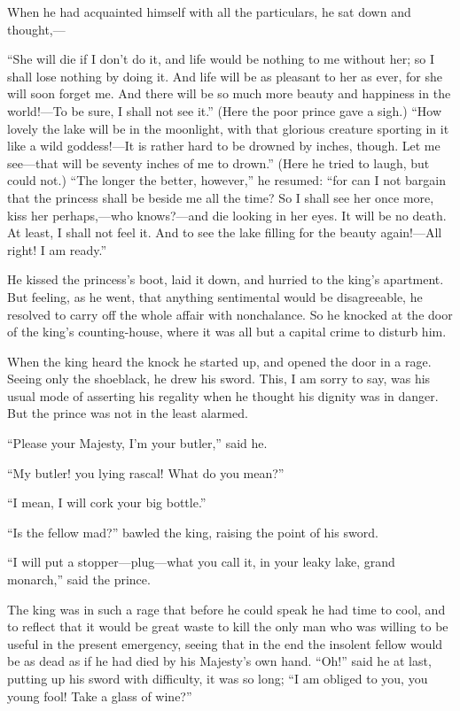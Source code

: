 \documentclass[12pt]{memoir}
\begin{document}
When he had acquainted himself with all the particulars, he sat down
and thought,---

``She will die if I don't do it, and life would be nothing to me
without her; so I shall lose nothing by doing it.  And life will be as
pleasant to her as ever, for she will soon forget me.  And there will
be so much more beauty and happiness in the world!---To be sure, I
shall not see it.''  (Here the poor prince gave a sigh.) ``How lovely
the lake will be in the moonlight, with that glorious creature
sporting in it like a wild goddess!---It is rather hard to be drowned
by inches, though.  Let me see---that will be seventy inches of me to
drown.''  (Here he tried to laugh, but could not.)  ``The longer the
better, however,'' he resumed: ``for can I not bargain that the
princess shall be beside me all the time?  So I shall see her once
more, kiss her perhaps,---who knows?---and die looking in her eyes.
It will be no death.  At least, I shall not feel it.  And to see the
lake filling for the beauty again!---All right!  I am ready.''

He kissed the princess's boot, laid it down, and hurried to the king's
apartment.  But feeling, as he went, that anything sentimental would
be disagreeable, he resolved to carry off the whole affair with
nonchalance.  So he knocked at the door of the king's counting-house,
where it was all but a capital crime to disturb him.

When the king heard the knock he started up, and opened the door in a
rage.  Seeing only the shoeblack, he drew his sword.  This, I am sorry
to say, was his usual mode of asserting his regality when he thought
his dignity was in danger.  But the prince was not in the least
alarmed.

``Please your Majesty, I'm your butler,'' said he.

``My butler! you lying rascal!  What do you mean?''

``I mean, I will cork your big bottle.''

``Is the fellow mad?'' bawled the king, raising the point of his
sword.

``I will put a stopper---plug---what you call it, in your leaky lake,
grand monarch,'' said the prince.

The king was in such a rage that before he could speak he had time to
cool, and to reflect that it would be great waste to kill the only man
who was willing to be useful in the present emergency, seeing that in
the end the insolent fellow would be as dead as if he had died by his
Majesty's own hand.  ``Oh!'' said he at last, putting up his sword
with difficulty, it was so long; ``I am obliged to you, you young
fool!  Take a glass of wine?''
\end{document}
